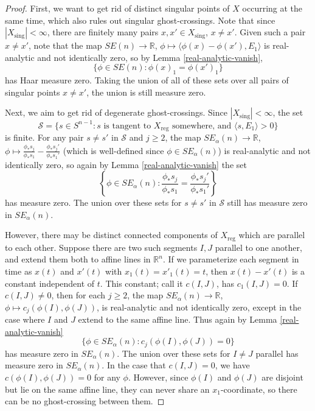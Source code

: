 \documentclass[11pt,reqno,twoside]{amsart}
\newcommand{\reg}{\mathrm{reg}}
\newcommand{\sing}{\mathrm{sing}}
\theoremstyle{definition}
\begin{document}
\begin{proof}
First, we want to get rid of distinct singular points of $X$ occurring at the same time, which also rules out singular ghost-crossings. Note that since $|X_\sing| < \infty$, there are finitely many pairs $x,x' \in X_\sing$, $x \neq x'$. Given such a pair $x \neq x'$, note that the map $SE(n) \to \mathbb{R}$, $\phi \mapsto \langle \phi(x)-\phi(x'),E_1\rangle$ is real-analytic and not identically zero, so by Lemma \ref{real-analytic-vanish}, \[\{\phi \in SE(n): \phi(x)_1 = \phi(x')_1\}\] has Haar measure zero. Taking the union of all of these sets over all pairs of singular points $x \neq x'$, the union is still measure zero.

Next, we aim to get rid of degenerate ghost-crossings. Since $|X_\sing| < \infty$, the set
\[\mathcal{S} = \{s \in S^{n-1}: s \text{ is tangent to } X_\reg \text{ somewhere, and } \langle s,E_1\rangle > 0 \}\]
is finite. For any pair $s \neq s'$ in $\mathcal{S}$ and $j \geq 2$, the map $SE_\alpha(n) \to \mathbb{R}$, $\phi \mapsto \frac{\phi_* s_j}{\phi_* s_1} - \frac{\phi_* s_j'}{\phi_* s_1'}$ (which is well-defined since $\phi \in SE_\alpha(n)$) is real-analytic and not identically zero, so again by Lemma \ref{real-analytic-vanish} the set
\[\left\{\phi \in SE_\alpha(n): \frac{\phi_* s_j}{\phi_* s_1} = \frac{\phi_* s_j'}{\phi_* s_1'}\right\}\]
has measure zero. The union over these sets for $s \neq s'$ in $\mathcal{S}$ still has measure zero in $SE_\alpha(n)$.

However, there may be distinct connected components of $X_\reg$ which are parallel to each other. Suppose there are two such segments $I,J$ parallel to one another, and extend them both to affine lines in $\mathbb{R}^n$. If we parameterize each segment in time as $x(t)$ and $x'(t)$ with $x_1(t) = x'_1(t) = t$, then $x(t) - x'(t)$ is a constant independent of $t$. This constant; call it $c(I,J)$, has $c_1(I,J) = 0$. If $c(I,J) \neq 0$, then for each $j \geq 2$, the map $SE_\alpha(n) \to \mathbb{R}$, $\phi \mapsto c_j(\phi(I),\phi(J))$, is real-analytic and not identically zero, except in the case where $I$ and $J$ extend to the same affine line. Thus again by Lemma \ref{real-analytic-vanish}
\[\{\phi \in SE_\alpha(n): c_j(\phi(I),\phi(J)) = 0\}\] has measure zero in $SE_\alpha(n)$.
The union over these sets for $I \neq J$ parallel has measure zero in $SE_\alpha(n)$. In the case that $c(I,J) = 0$, we have $c(\phi(I),\phi(J)) = 0$ for any $\phi$. However, since $\phi(I)$ and $\phi(J)$ are disjoint but lie on the same affine line, they can never share an $x_1$-coordinate, so there can be no ghost-crossing between them. 


\end{proof}
\end{document}
